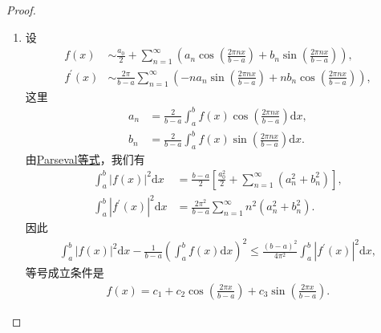 \documentclass[../../main.tex]{subfiles}
\begin{document}
\begin{proof}
\begin{enumerate}[(1)]
\item 设
\begin{align*}
f(x) &\sim \frac{a_0}{2}+\sum_{n = 1}^{\infty}\left(a_n\cos\left(\frac{2\pi nx}{b - a}\right)+b_n\sin\left(\frac{2\pi nx}{b - a}\right)\right),\\
f^{\prime}(x) &\sim \frac{2\pi}{b - a}\sum_{n = 1}^{\infty}\left(-na_n\sin\left(\frac{2\pi nx}{b - a}\right)+nb_n\cos\left(\frac{2\pi nx}{b - a}\right)\right),
\end{align*}
这里
\begin{align*}
a_n&=\frac{2}{b - a}\int_{a}^{b}f(x)\cos\left(\frac{2\pi nx}{b - a}\right)\mathrm{d}x,\\
b_n&=\frac{2}{b - a}\int_{a}^{b}f(x)\sin\left(\frac{2\pi nx}{b - a}\right)\mathrm{d}x.
\end{align*}
由\hyperref[theorem:Parseval等式]{Parseval等式}，我们有
\begin{align*}
\int_{a}^{b}|f(x)|^2\mathrm{d}x&=\frac{b - a}{2}\left[\frac{a_0^2}{2}+\sum_{n = 1}^{\infty}(a_n^2 + b_n^2)\right],\\
\int_{a}^{b}|f^{\prime}(x)|^2\mathrm{d}x&=\frac{2\pi^2}{b - a}\sum_{n = 1}^{\infty}n^2(a_n^2 + b_n^2).
\end{align*}
因此
\begin{align*}
\int_{a}^{b}|f(x)|^2\mathrm{d}x-\frac{1}{b - a}\left(\int_{a}^{b}f(x)\mathrm{d}x\right)^2\leq\frac{(b - a)^2}{4\pi^2}\int_{a}^{b}|f^{\prime}(x)|^2\mathrm{d}x,
\end{align*}
等号成立条件是
\begin{align*}
f(x)=c_1 + c_2\cos\left(\frac{2\pi x}{b - a}\right)+c_3\sin\left(\frac{2\pi x}{b - a}\right).
\end{align*}


\end{enumerate}
\end{proof}
\end{document}
